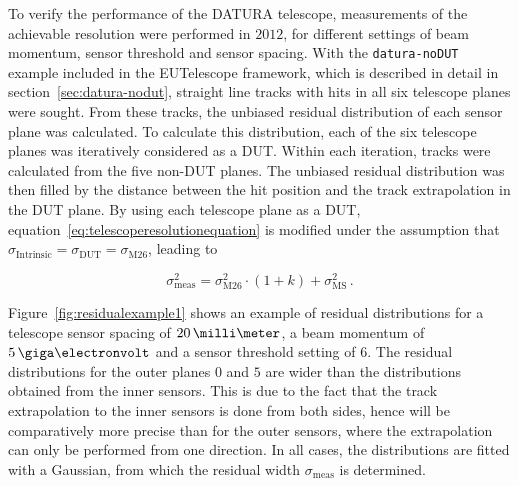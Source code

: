 To verify the performance of the {DATURA} telescope, measurements of the
achievable resolution were performed in $2012$, for different settings of beam
momentum, sensor threshold and sensor spacing. With the \texttt{datura-noDUT}
example included in the {EUTelescope} framework, which is described in detail in
section~\ref{sec:datura-nodut}, straight line tracks with hits in all six
telescope planes were sought. From these tracks, the unbiased residual
distribution of each sensor plane was calculated. To calculate this
distribution, each of the six telescope planes was iteratively considered as a
DUT. Within each iteration, tracks were calculated from the five non-DUT planes.
The unbiased residual distribution was then filled by the distance between the
hit position and the track extrapolation in the DUT plane. By using each
telescope plane as a DUT, equation~\ref{eq:telescoperesolutionequation} is
modified under the assumption that $\sigma_{\textrm{Intrinsic}} =
\sigma_{\textrm{DUT}} = \sigma_{\textrm{M26}}$, leading to

\begin{equation}
\label{eq:telescoperesolutionequation_2}
\sigma_{\textrm{meas}}^2 = \sigma_{\textrm{M26}}^2 \cdot \left( 1 + k \right) +
\sigma_{\textrm{MS}}^2\,.
\end{equation}


Figure~\ref{fig:residualexample1} shows an example of residual distributions for
a telescope sensor spacing of $20\,\milli\meter$, a beam momentum of
$5\,\giga\electronvolt$ and a sensor threshold setting of $6$. The residual
distributions for the outer planes $0$ and $5$ are wider than the distributions
obtained from the inner sensors. This is due to the fact that the track
extrapolation to the inner sensors is done from both sides, hence will be
comparatively more precise than for the outer sensors, where the extrapolation
can only be performed from one direction. In all cases, the distributions are
fitted with a Gaussian, from which the residual width $\sigma_{\textrm{meas}}$
is determined.\\

